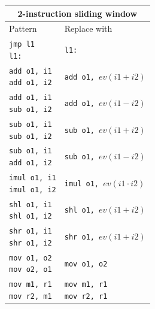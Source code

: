 \documentclass[thesis=M,english]{FITthesis}[2019/12/23]
\begin{document}
\begin{table}
\footnotesize
\begin{minipage}{.45\linewidth}
    \centering
    \begin{tabular}{|l|l|}
        \hline
        \multicolumn{2}{|c|}{2-instruction sliding window} \\
        \hline
        Pattern & Replace with\\
        \hline
        \hline
        \makecell{ \texttt{jmp l1} \\ \texttt{l1:} } & \texttt{l1:}\\
        \hline
        \makecell{ \texttt{add o1, i1} \\ \texttt{add o1, i2} } & \texttt{add o1, }$ev(i1 + i2)$\\
        \hline
        \makecell{ \texttt{add o1, i1} \\ \texttt{sub o1, i2} } & \texttt{add o1, }$ev(i1 - i2)$\\
        \hline
        \makecell{ \texttt{sub o1, i1} \\ \texttt{sub o1, i2} } & \texttt{sub o1, }$ev(i1 + i2)$\\
        \hline
        \makecell{ \texttt{sub o1, i1} \\ \texttt{add o1, i2} } & \texttt{sub o1, }$ev(i1 - i2)$\\
        \hline
        \makecell{ \texttt{imul o1, i1} \\ \texttt{imul o1, i2} } & \texttt{imul o1, }$ev(i1 \cdot i2)$\\
        \hline
        \makecell{ \texttt{shl o1, i1} \\ \texttt{shl o1, i2} } & \texttt{shl o1, }$ev(i1 + i2)$\\
        \hline
        \makecell{ \texttt{shr o1, i1} \\ \texttt{shr o1, i2} } & \texttt{shr o1, }$ev(i1 + i2)$\\
        \hline
        \makecell{ \texttt{mov o1, o2} \\ \texttt{mov o2, o1} } & \texttt{mov o1, o2}\\
        \hline
        \makecell{ \texttt{mov m1, r1} \\ \texttt{mov r2, m1} } & \makecell{ \texttt{mov m1, r1} \\ \texttt{mov r2, r1} }\\
        \hline
    \end{tabular}
\end{minipage}%
\begin{minipage}{.55\linewidth}

\end{minipage}
\end{table}
\end{document}
